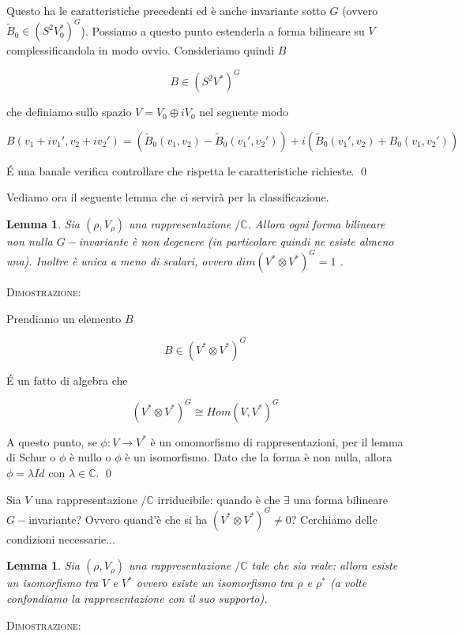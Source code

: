 \documentclass[11pt]{article}
\theoremstyle{plain}
\newtheorem{lemma}[thm]{Lemma}
\theoremstyle{definition}
\theoremstyle{remark}
\newcommand{\C}{\mathbb{C}}
\begin{document}
Questo ha le caratteristiche precedenti ed è anche invariante sotto $G$ (ovvero $\tilde B_0\in (S^2V_0^*)^G$). Possiamo a questo punto estenderla a forma bilineare su $V$ complessificandola in modo ovvio. Consideriamo quindi $B$

\[B \in (S^2V^*)^G \]

che definiamo sullo spazio $V = V_0 \oplus i V_0$ nel seguente modo

\[B(v_1 + i v_1', v_2 + i v_2') = \left( \tilde B_0(v_1, v_2) - \tilde B_0(v_1', v_2')\right)  + i \left( \tilde B_0(v_1', v_2) + B_0(v_1, v_2')\right)\]




\'E una banale verifica controllare che rispetta le caratteristiche richieste.
\qed


Vediamo ora il seguente lemma che ci servirà per la classificazione.

\begin{lemma}
Sia $(\rho, V_\rho)$ una rappresentazione $/\C$. Allora ogni forma bilineare non nulla $G-$invariante è non degenere (in particolare quindi ne esiste almeno una). Inoltre è unica a meno di scalari, ovvero $dim (V^*\otimes V^*)^G=1$ .
\end{lemma}

\textsc{Dimostrazione:}

Prendiamo un elemento $B$

\[B \in \left( V^* \otimes V^*\right) ^G \]

\'E un fatto di algebra che 

\[\left(V^* \otimes V^*\right)^G \cong Hom(V, V^*)^G \]

A questo punto, se $\phi: V\to V^*$ è un omomorfismo di rappresentazioni, per il lemma di Schur o $\phi$ è nullo o $\phi$ è un isomorfismo. Dato che la forma è non nulla, allora $\phi = \lambda Id$ con $\lambda \in \C$.   \qed 

Sia $V$ una rappresentazione $/\C$ irriducibile: quando è che $\exists$ una forma bilineare $G-$invariante? Ovvero quand'è che si ha $\left(V^* \otimes V^*\right)^G \neq 0$? Cerchiamo delle condizioni necessarie...
\begin{lemma} 
Sia $(\rho, V_\rho)$ una rappresentazione $/\C$ tale che sia reale: allora esiste un isomorfismo tra $V$ e $V^*$ ovvero esiste un isomorfismo tra $\rho$ e $\rho^*$ (a volte confondiamo la rappresentazione con il suo supporto).
\end{lemma}

\textsc{Dimostrazione:}
\end{document}
